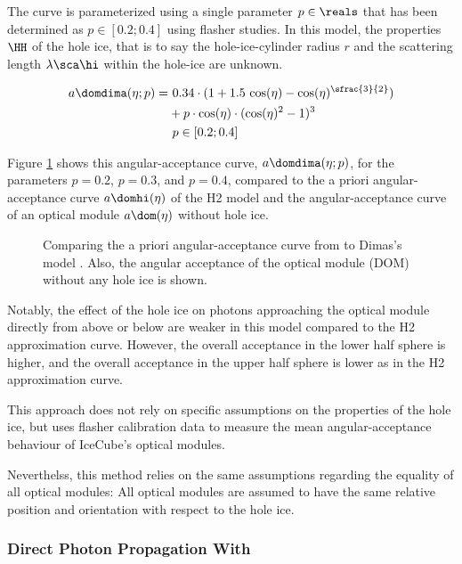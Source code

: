The curve is parameterized using a single parameter $p\in\reals$ that has been determined as $p \in [0.2;0.4]$ using flasher studies. \cite{msuforwardholeice} In this model, the properties $\HH$ of the hole ice, that is to say the hole-ice-cylinder radius $r$ and the scattering length $\lambda\sca\hi$ within the hole-ice are unknown.

\begin{align}
  a\domdima(\eta;p) = & \ 0.34 \cdot (1 + 1.5\,\cos(\eta) - \cos(\eta)^{\sfrac{3}{2}}) \nonumber \\
      & + p \cdot \cos(\eta) \cdot  (\cos(\eta)^2 - 1)^3 \\
      & \ p \in [0.2;0.4] \nonumber
  \label{eq:adima}
\end{align}

Figure \ref{fig:Vohn9Oov} shows this angular-acceptance curve, $a\domdima(\eta;p)$, for the parameters $p=0.2$, $p=0.3$, and $p=0.4$, compared to the a priori angular-acceptance curve $a\domhi(\eta)$ of the H2 model and the angular-acceptance curve of an optical module $a\dom(\eta)$ without hole ice.

\begin{figure}[htbp]
  \caption{Comparing the a priori angular-acceptance curve from \cite{icepaper} to Dimas's model \cite{flasherdataderivedicemodels}. Also, the angular acceptance of the optical module (DOM) without any hole ice is shown.}
  \label{fig:Vohn9Oov}
\end{figure}

Notably, the effect of the hole ice on photons approaching the optical module directly from above or below are weaker in this model compared to the H2 approximation curve. However, the overall acceptance in the lower half sphere is higher, and the overall acceptance in the upper half sphere is lower as in the H2 approximation curve.

This approach does not rely on specific assumptions on the properties of the hole ice, but uses flasher calibration data to measure the mean angular-acceptance behaviour of IceCube's optical modules.

Neverthelss, this method relies on the same assumptions regarding the equality of all optical modules: All optical modules are assumed to have the same relative position and orientation with respect to the hole ice.


\subsubsection{Direct Photon Propagation With \ppc}


